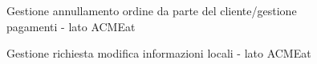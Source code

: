 \documentclass[11pt]{article} %
\begin{document}
\begin{figure}[!ht]
\begin{center}
\caption{Gestione annullamento ordine da parte del cliente/gestione pagamenti - lato ACMEat}
\end{center}
\end{figure}

\begin{figure}[!ht]
\begin{center}
\caption{Gestione richiesta modifica informazioni locali - lato ACMEat}
\end{center}
\end{figure}
\end{document}
